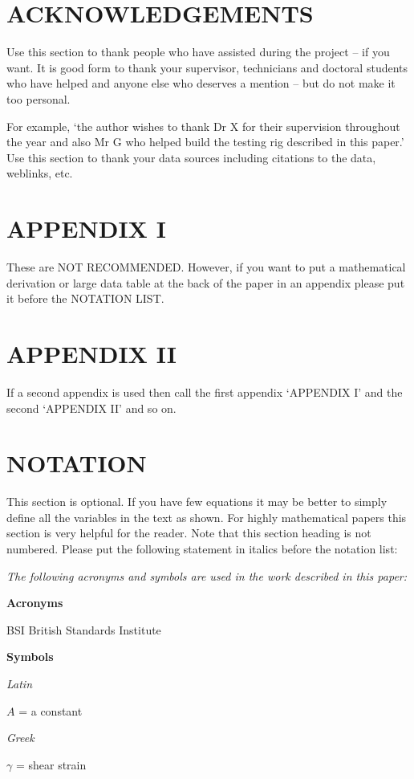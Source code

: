 \documentclass[a4paper,10pt]{article}
\begin{document}
\section{ACKNOWLEDGEMENTS}

Use this section to thank people who have assisted during the project – if you want. It is good form to thank your supervisor, technicians and doctoral students who have helped and anyone else who deserves a mention – but do not make it too personal. 

For example, ‘the author wishes to thank Dr X for their supervision throughout the year and also Mr G who helped build the testing rig described in this paper.’
Use this section to thank your data sources including citations to the data, weblinks, etc.

\section{APPENDIX I}

These are NOT RECOMMENDED. However, if you want to put a mathematical derivation or large data table at the back of the paper in an appendix please put it before the NOTATION LIST. 

\section{APPENDIX II}

If a second appendix is used then call the first appendix ‘APPENDIX I’ and the second ‘APPENDIX II’ and so on.

\section{NOTATION}

This section is optional. If you have few equations it may be better to simply define all the variables in the text as shown. For highly mathematical papers this section is very helpful for the reader. Note that this section heading is not numbered. Please put the following statement in italics before the notation list:

\textit{The following acronyms and symbols are used in the work described in this paper:}

\textbf{Acronyms}

BSI	 British Standards Institute

\textbf{Symbols}

\textit{Latin}

$A$ = a constant

\textit{Greek}

$\gamma$ = shear strain



\fontsize{8}{9}\selectfont




\clearpage
\end{document}
